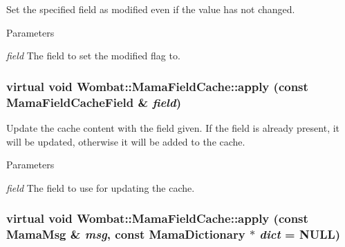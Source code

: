 Set the specified field as modified even if the value has not changed. 
\begin{DoxyParams}{Parameters}
\item[{\em field}]The field to set the modified flag to. \end{DoxyParams}
\hypertarget{classWombat_1_1MamaFieldCache_ab0e54b7daa08ea7f93ec5bb7ca2327e0}{
\subsubsection[{apply}]{\setlength{\rightskip}{0pt plus 5cm}virtual void Wombat::MamaFieldCache::apply (const {\bf MamaFieldCacheField} \& {\em field})}}
\label{classWombat_1_1MamaFieldCache_ab0e54b7daa08ea7f93ec5bb7ca2327e0}


Update the cache content with the field given. If the field is already present, it will be updated, otherwise it will be added to the cache.


\begin{DoxyParams}{Parameters}
\item[{\em field}]The field to use for updating the cache. \end{DoxyParams}
\hypertarget{classWombat_1_1MamaFieldCache_ac28a7674251608149028785424130160}{
\subsubsection[{apply}]{\setlength{\rightskip}{0pt plus 5cm}virtual void Wombat::MamaFieldCache::apply (const {\bf MamaMsg} \& {\em msg}, \/  const {\bf MamaDictionary} $\ast$ {\em dict} = {\ttfamily NULL})}}
\label{classWombat_1_1MamaFieldCache_ac28a7674251608149028785424130160}


